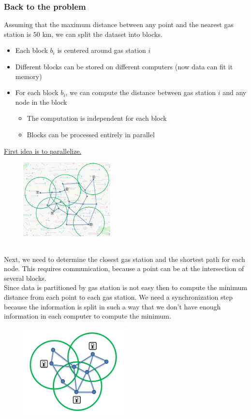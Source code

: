 \documentclass[10pt,a4paper]{article}
\begin{document}
\subsubsection{Back to the problem}
Assuming that the maximum distance between any point and the nearest gas station is 50 km, we can split the dataset into blocks.
\begin{itemize}
	\item Each block $b_i$ is centered around gas station $i$
	\item Different blocks can be stored on different computers (now data can fit it memory)
	\item For each block $b_i$, we can compute the distance between gas station $i$ and any node in the block
	\begin{itemize}
		\item The computation is independent for each block
		\item Blocks can be processed entirely in parallel
	\end{itemize}
\end{itemize}
\underline{First idea is to parallelize.}
\begin{figure}[h!]
\hfill \includegraphics[width=135pt]{images/gas-stations2.png}\hspace*{\fill}
  \label{fig:gas-stations2}
\end{figure}  \\
Next, we need to determine the closest gas station and the shortest path for each node. This requires communication, because a point can be at the intersection of several blocks. \\ Since data is partitioned by gas station is not easy then to compute the minimum distance from each point to each gas station. We need a synchronization step because the information is split in such a way that we don't have enough information in each computer to compute the minimum.
\begin{figure}[h!]
\hfill \includegraphics[width=160pt]{images/gas-stations3.png}\hspace*{\fill}
  \label{fig:gas-stations3}
\end{figure} 
\end{document}
